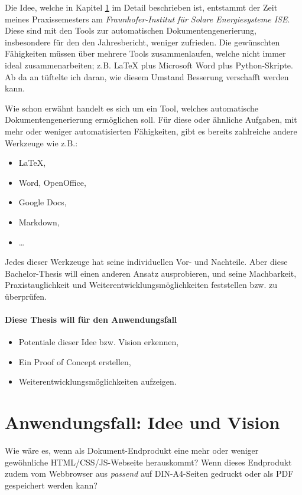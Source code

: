 Die Idee, welche in Kapitel \ref{sec-idee} im Detail beschrieben ist,
entstammt der Zeit meines Praxissemesters am
\emph{Fraunhofer-Institut für Solare Energiesysteme ISE}.
Diese sind mit den Tools zur automatischen Dokumentengenerierung, insbesondere
für den den Jahresbericht, weniger zufrieden. Die gewünschten
Fähigkeiten müssen über mehrere Tools zusammenlaufen, welche nicht immer
ideal zusammenarbeiten; z.B. LaTeX plus Microsoft Word plus Python-Skripte.
Ab da an tüftelte ich daran, wie diesem Umstand Besserung verschafft
werden kann.

Wie schon erwähnt handelt es sich um ein Tool, welches automatische
Dokumentengenerierung ermöglichen soll. Für diese oder ähnliche Aufgaben,
mit mehr oder weniger automatisierten Fähigkeiten,
gibt es bereits zahlreiche andere Werkzeuge wie z.B.:

\begin{itemize}
  \item LaTeX,
  \item Word, OpenOffice,
  \item Google Docs,
  \item Markdown,
  \item \ldots
\end{itemize}

Jedes dieser Werkzeuge hat seine individuellen Vor- und Nachteile.
Aber diese Bachelor-Thesis will einen anderen Ansatz ausprobieren, und
seine Machbarkeit, Praxistauglichkeit und Weiterentwicklungsmöglichkeiten
feststellen bzw. zu überprüfen.

\paragraph{Diese Thesis will für den Anwendungsfall}

\begin{itemize}
  \item Potentiale dieser Idee bzw. Vision erkennen,
  \item Ein Proof of Concept erstellen,
  \item Weiterentwicklungsmöglichkeiten aufzeigen.
\end{itemize}

\section{Anwendungsfall: Idee und Vision}\label{sec-idee}

Wie wäre es, wenn als Dokument-Endprodukt eine mehr oder weniger
gewöhnliche HTML/CSS/JS-Webseite herauskommt?
Wenn dieses Endprodukt zudem vom Webbrowser aus \emph{passend} auf
DIN-A4-Seiten gedruckt oder als PDF gespeichert werden kann?

